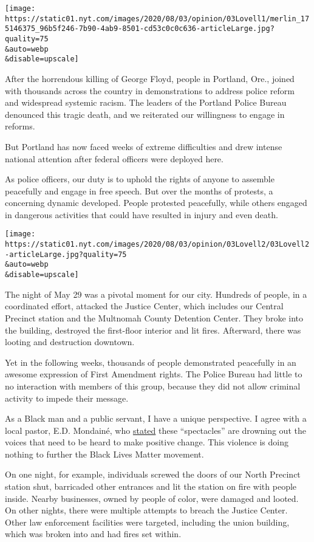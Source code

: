 \texttt{[image: https://static01.nyt.com/images/2020/08/03/opinion/03Lovell1/merlin\_175146375\_96b5f246-7b90-4ab9-8501-cd53c0c0c636-articleLarge.jpg?quality=75\\\&auto=webp\\\&disable=upscale]}

After the horrendous killing of George Floyd, people in Portland, Ore.,
joined with thousands across the country in demonstrations to address
police reform and widespread systemic racism. The leaders of the
Portland Police Bureau denounced this tragic death, and we reiterated
our willingness to engage in reforms.

But Portland has now faced weeks of extreme difficulties and drew
intense national attention after federal officers were deployed here.

As police officers, our duty is to uphold the rights of anyone to
assemble peacefully and engage in free speech. But over the months of
protests, a concerning dynamic developed. People protested peacefully,
while others engaged in dangerous activities that could have resulted in
injury and even death.

\texttt{[image: https://static01.nyt.com/images/2020/08/03/opinion/03Lovell2/03Lovell2-articleLarge.jpg?quality=75\\\&auto=webp\\\&disable=upscale]}

The night of May 29 was a pivotal moment for our city. Hundreds of
people, in a coordinated effort, attacked the Justice Center, which
includes our Central Precinct station and the Multnomah County Detention
Center. They broke into the building, destroyed the first-floor interior
and lit fires. Afterward, there was looting and destruction downtown.

Yet in the following weeks, thousands of people demonstrated peacefully
in an awesome expression of First Amendment rights. The Police Bureau
had little to no interaction with members of this group, because they
did not allow criminal activity to impede their message.

As a Black man and a public servant, I have a unique perspective. I
agree with a local pastor, E.D. Mondainé, who
\href{https://www.washingtonpost.com/opinions/2020/07/23/portlands-protests-were-supposed-be-about-black-lives-now-theyre-white-spectacle/}{stated}
these ``spectacles'' are drowning out the voices that need to be heard
to make positive change. This violence is doing nothing to further the
Black Lives Matter movement.

On one night, for example, individuals screwed the doors of our North
Precinct station shut, barricaded other entrances and lit the station on
fire with people inside. Nearby businesses, owned by people of color,
were damaged and looted. On other nights, there were multiple attempts
to breach the Justice Center. Other law enforcement facilities were
targeted, including the union building, which was broken into and had
fires set within.

